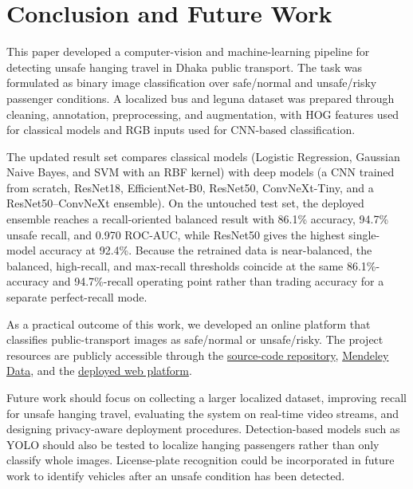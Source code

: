 \documentclass{article}
\begin{document}
\FloatBarrier
\section{Conclusion and Future Work}
This paper developed a computer-vision and machine-learning pipeline for detecting unsafe hanging travel in Dhaka public transport. The task was formulated as binary image classification over safe/normal and unsafe/risky passenger conditions. A localized bus and leguna dataset was prepared through cleaning, annotation, preprocessing, and augmentation, with HOG features used for classical models and RGB inputs used for CNN-based classification.

The updated result set compares classical models (Logistic Regression, Gaussian Naive Bayes, and SVM with an RBF kernel) with deep models (a CNN trained from scratch, ResNet18, EfficientNet-B0, ResNet50, ConvNeXt-Tiny, and a ResNet50--ConvNeXt ensemble). On the untouched test set, the deployed ensemble reaches a recall-oriented balanced result with 86.1\% accuracy, 94.7\% unsafe recall, and 0.970 ROC-AUC, while ResNet50 gives the highest single-model accuracy at 92.4\%. Because the retrained data is near-balanced, the balanced, high-recall, and max-recall thresholds coincide at the same 86.1\%-accuracy and 94.7\%-recall operating point rather than trading accuracy for a separate perfect-recall mode.


As a practical outcome of this work, we developed an online platform that classifies public-transport images as safe/normal or unsafe/risky. The project resources are publicly accessible through the \href{https://github.com/TanzilaKhan1/Detection-of-Hanging-Passengers/}{source-code repository}, \href{https://data.mendeley.com/datasets/24n4zpdt69/1}{Mendeley Data}, and the \href{https://ml-predictor-app.streamlit.app/}{deployed web platform}.


Future work should focus on collecting a larger localized dataset, improving recall for unsafe hanging travel, evaluating the system on real-time video streams, and designing privacy-aware deployment procedures. Detection-based models such as YOLO \cite{redmon2016yolo} should also be tested to localize hanging passengers rather than only classify whole images. License-plate recognition could be incorporated in future work to identify vehicles after an unsafe condition has been detected.
\end{document}
